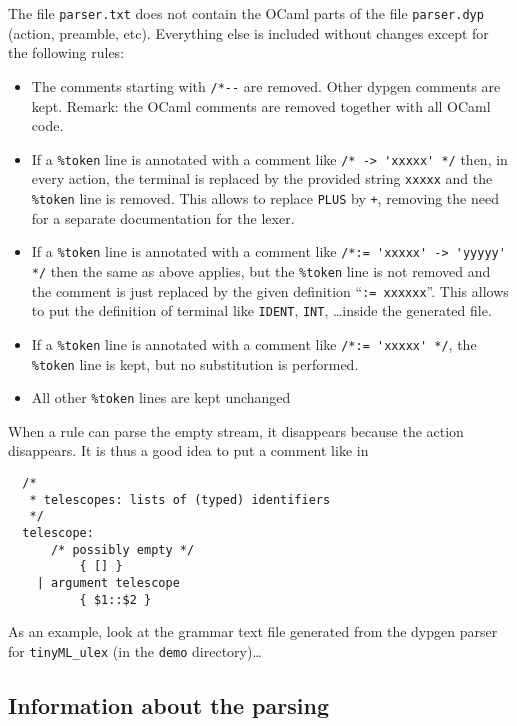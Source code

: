 \documentclass[12pt]{article}
\begin{document}
{The file \verb|parser.txt| does not contain the OCaml parts of the file \verb|parser.dyp| (action, preamble, etc). Everything else is included without changes except for the following rules:

\begin{itemize}

\item The comments starting with \verb|/*--| are removed. Other dypgen comments
are kept. Remark: the OCaml comments are removed together with all OCaml code.

\item If a \verb|%token| line is annotated with a comment like
\verb|/* -> 'xxxxx' */| then, in every action, the terminal is replaced by the provided string \verb|xxxxx| and the \verb|%token| line is removed.  This allows to replace \verb|PLUS| by \verb|+|, removing the need for a separate documentation for the lexer.

\item If a \verb|%token| line is annotated with a comment like
\verb|/*:= 'xxxxx' -> 'yyyyy' */| then the same as above applies, but the \verb|%token| line is
not removed and the comment is just replaced by the given definition
``\verb|:= xxxxxx|''.  This allows to put the definition of terminal like \verb|IDENT|, \verb|INT|, \ldots  inside the generated file.

\item If a \verb|%token| line is annotated with a comment like
\verb|/*:= 'xxxxx' */|, the \verb|%token| line is kept, but no substitution is performed.

\item All other \verb|%token| lines are kept unchanged

\end{itemize}

When a rule can parse the empty stream, it disappears because the action
disappears. It is thus a good idea to put a comment like in

\begin{verbatim}
  /*
   * telescopes: lists of (typed) identifiers
   */
  telescope:
      /* possibly empty */
          { [] }
    | argument telescope
          { $1::$2 }
\end{verbatim}

As an example, look at the grammar text file generated from the dypgen
parser for \verb|tinyML_ulex| (in the \verb|demo| directory)\ldots

\subsection{Information about the parsing}\label{verbose}

}
\end{document}
